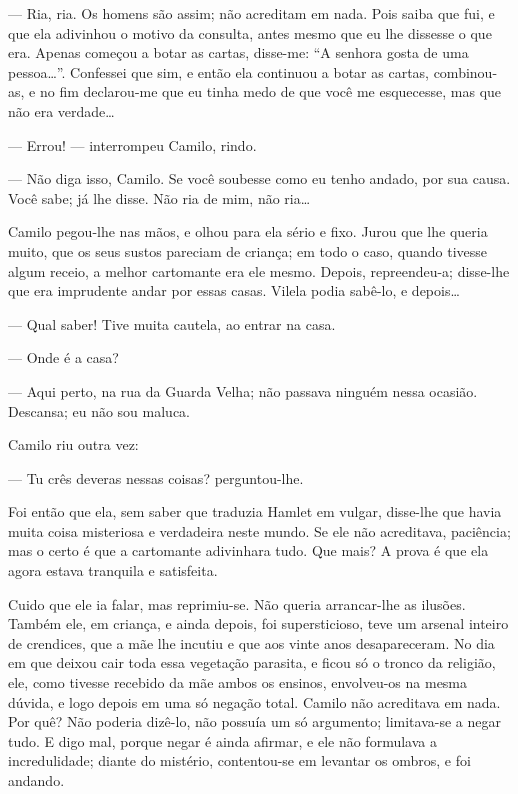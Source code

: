 --- Ria, ria. Os homens são assim; não acreditam em nada. Pois saiba que
fui, e que ela adivinhou o motivo da consulta, antes mesmo que eu lhe
dissesse o que era. Apenas começou a botar as cartas, disse-me: ``A
senhora gosta de uma pessoa\ldots{}''. Confessei que sim, e então ela
continuou a botar as cartas, combinou-as, e no fim declarou-me que eu
tinha medo de que você me esquecesse, mas que não era verdade\ldots{}

--- Errou! --- interrompeu Camilo, rindo.

--- Não diga isso, Camilo. Se você soubesse como eu tenho andado, por sua
causa. Você sabe; já lhe disse. Não ria de mim, não ria\ldots{}

Camilo pegou-lhe nas mãos, e olhou para ela sério e fixo. Jurou que lhe
queria muito, que os seus sustos pareciam de criança; em todo o caso,
quando tivesse algum receio, a melhor cartomante era ele mesmo. Depois,
repreendeu-a; disse-lhe que era imprudente andar por essas casas. Vilela
podia sabê-lo, e depois\ldots{}

--- Qual saber! Tive muita cautela, ao entrar na casa.

--- Onde é a casa?

--- Aqui perto, na rua da Guarda Velha; não passava ninguém nessa
ocasião. Descansa; eu não sou maluca.

Camilo riu outra vez:

--- Tu crês deveras nessas coisas? perguntou-lhe.

Foi então que ela, sem saber que traduzia Hamlet em vulgar, disse-lhe
que havia muita coisa misteriosa e verdadeira neste mundo. Se ele não
acreditava, paciência; mas o certo é que a cartomante adivinhara tudo.
Que mais? A prova é que ela agora estava tranquila e satisfeita.

Cuido que ele ia falar, mas reprimiu-se. Não queria arrancar-lhe as
ilusões. Também ele, em criança, e ainda depois, foi supersticioso, teve
um arsenal inteiro de crendices, que a mãe lhe incutiu e que aos vinte
anos desapareceram. No dia em que deixou cair toda essa vegetação
parasita, e ficou só o tronco da religião, ele, como tivesse recebido da
mãe ambos os ensinos, envolveu-os na mesma dúvida, e logo depois em uma
só negação total. Camilo não acreditava em nada. Por quê? Não poderia
dizê-lo, não possuía um só argumento; limitava-se a negar tudo. E digo
mal, porque negar é ainda afirmar, e ele não formulava a incredulidade;
diante do mistério, contentou-se em levantar os ombros, e foi andando.

